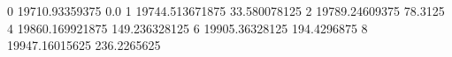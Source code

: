 0 19710.93359375 0.0
1 19744.513671875 33.580078125
2 19789.24609375 78.3125
4 19860.169921875 149.236328125
6 19905.36328125 194.4296875
8 19947.16015625 236.2265625
